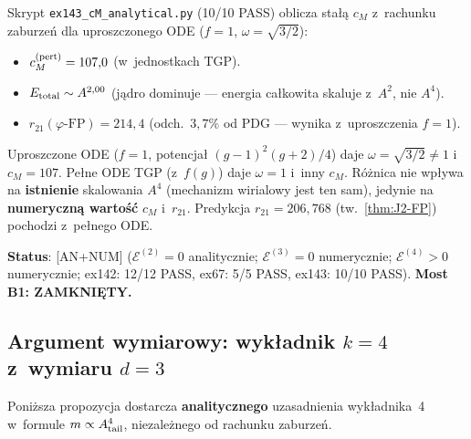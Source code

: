 Skrypt \texttt{ex143\_cM\_analytical.py} (10/10 PASS)
oblicza sta\l{}\k{a} $c_M$ z~rachunku zaburze\'n
dla uproszczonego ODE ($f = 1$, $\omega = \sqrt{3/2}$):
\begin{itemize}[nosep]
  \item $c_M^{(\rm pert)} = 107{,}0$ (w~jednostkach TGP).
  \item $E_{\rm total} \sim A^{2{,}00}$ (j\k{a}dro dominuje ---
    energia ca\l{}kowita skaluje z~$A^2$, nie $A^4$).
  \item $r_{21}(\varphi\text{-FP}) = 214{,}4$
    (odch.~$3{,}7\%$ od PDG --- wynika z~uproszczenia $f = 1$).
\end{itemize}

\begin{remark}%
\label{rem:R-omega-disc}
Uproszczone ODE ($f=1$, potencja\l{} $(g-1)^2(g+2)/4$)
daje $\omega = \sqrt{3/2} \neq 1$ i~$c_M = 107$.
Pe\l{}ne ODE TGP (z~$f(g)$) daje $\omega = 1$
i~inny $c_M$. R\'o\.znica nie wp\l{}ywa na
\textbf{istnienie} skalowania $A^4$ (mechanizm wirialowy
jest ten sam), jedynie na \textbf{numeryczn\k{a} warto\'s\'c}
$c_M$ i~$r_{21}$. Predykcja $r_{21} = 206{,}768$
(tw.~\ref{thm:J2-FP}) pochodzi z~pe\l{}nego ODE.
\end{remark}

\textbf{Status}:  [AN+NUM]
($\mathcal{E}^{(2)} = 0$ analitycznie;
$\mathcal{E}^{(3)} = 0$ numerycznie;
$\mathcal{E}^{(4)} > 0$ numerycznie;
ex142: 12/12 PASS, ex67: 5/5 PASS, ex143: 10/10 PASS).
\textbf{Most B1: ZAMKNI\k{E}TY.}


\subsection{Argument wymiarowy: wyk\l{}adnik $k = 4$ z~wymiaru $d = 3$}%
\label{ssec:R-dimensional-argument}

Poni\.zsza propozycja dostarcza \textbf{analitycznego} uzasadnienia
wyk\l{}adnika~4 w~formule $m \propto A_{\rm tail}^4$,
niezale\.znego od rachunku zaburze\'n.


